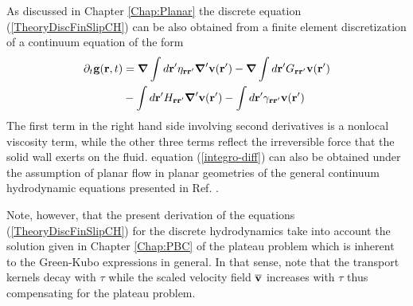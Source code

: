 \documentclass[b5paper,openright,10pt]{book}
\begin{document}
As  discussed  in Chapter \ref{Chap:Planar}
the discrete equation (\ref{TheoryDiscFinSlipCH})  can be also obtained from
a finite element discretization of a continuum equation of the form
\begin{align}
  \partial_t{\bf g}({\bf r},t)&=\boldsymbol{\nabla}\int d{\bf r}'
\eta_{{\bf r}{\bf r}'}\boldsymbol{\nabla}'{\bf v}({\bf r}')
-\boldsymbol{\nabla}\int d{\bf r}'
G_{{\bf r}{\bf r}'}{\bf v}({\bf r}')
\nonumber\\
&-\int d{\bf r}'H_{{\bf r}{\bf r}'}\boldsymbol{\nabla}'{\bf v}({\bf r}')
-\int d{\bf r}'
\gamma_{{\bf r}{\bf r}'}{\bf v}({\bf r}')
\label{integro-diff}
\end{align}
The first term in the right  hand side involving second derivatives is
a nonlocal  viscosity term, while  the other three terms  reflect the
irreversible   force    that   the   solid   wall    exerts   on   the
fluid.  equation  (\ref{integro-diff})  can  also  be  obtained  under  the
assumption  of  planar  flow  in  planar  geometries  of  the  general
continuum hydrodynamic equations presented in Ref. \cite{CamargoBC2018}.

Note, however, that the   present  derivation  of   the  equations
(\ref{TheoryDiscFinSlipCH}) for the discrete hydrodynamics take into account
the solution  given in Chapter \ref{Chap:PBC} of the plateau problem  which is
inherent to  the Green-Kubo  expressions in  general.  In  that sense,
note that  the transport  kernels decay with  $\tau$ while  the scaled
velocity  field   $\overline{\bf  v}$   increases  with   $\tau$  thus
compensating for the plateau problem.
\end{document}
